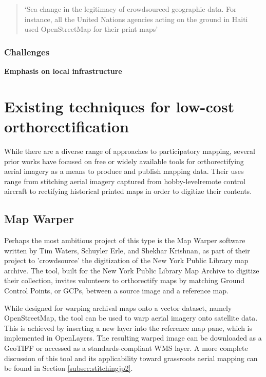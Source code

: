 \documentclass[11pt]{report}
\begin{document}
\begin{quote}`Sea change in the legitimacy of crowdsourced geographic data. For instance, all the United Nations agencies acting on the ground in Haiti used OpenStreetMap for their print maps'\end{quote} \cite{glennon2010grassrootscrisis}

\subsubsection{Challenges}
\textbf{Emphasis on local infrastructure}

\section{Existing techniques for low-cost orthorectification}
\label{sec:existingtechniques}

While there are a diverse range of approaches to participatory mapping, several prior works have focused on free or widely available tools for orthorectifying aerial imagery as a means to produce and publish mapping data. Their uses range from stitching aerial imagery captured from hobby-levelremote control aircraft to rectifying historical printed maps in order to digitize their contents.

\subsection{Map Warper}
\label{subsec:mapwarper}

Perhaps the most ambitious project of this type is the Map Warper software written by Tim Waters, Schuyler Erle, and Shekhar Krishnan, as part of their project to 'crowdsource' the digitization of the New York Public Library map archive. \cite{waters2009warper} The tool, built for the New York Public Library Map Archive to digitize their collection, invites volunteers to orthorectify maps by matching Ground Control Points, or GCPs, between a source image and a reference map. 

While designed for warping archival maps onto a vector dataset, namely OpenStreetMap, the tool can be used to warp aerial imagery onto satellite data. This is achieved by inserting a new layer into the reference map pane, which is implemented in OpenLayers. The resulting warped image can be downloaded as a \ac{GeoTIFF} or accessed as a standards-compliant WMS layer. A more complete discussion of this tool and its applicability toward grassroots aerial mapping can be found in Section \ref{subsec:stitchingjp2}.
\end{document}
